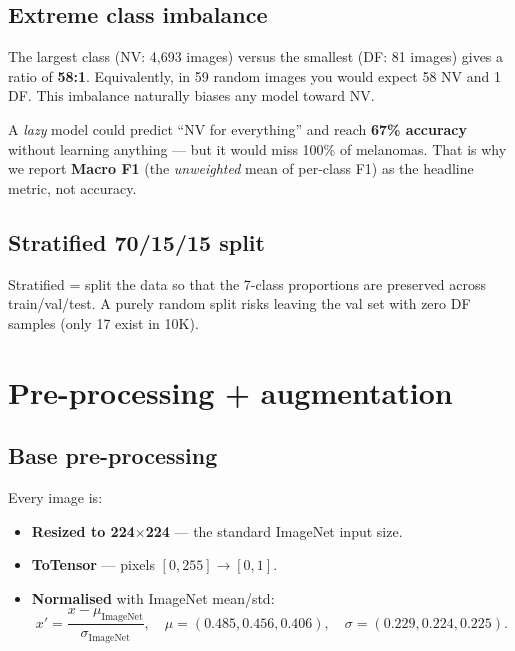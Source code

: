 \documentclass[11pt,a4paper]{article}
\begin{document}
\subsection{Extreme class imbalance}

\begin{simple}
The largest class (NV: 4{,}693 images) versus the smallest (DF: 81 images) gives a ratio of \textbf{58:1}. Equivalently, in 59 random images you would expect 58 NV and 1 DF. This imbalance naturally biases any model toward NV.
\end{simple}

\begin{idea}
A \textit{lazy} model could predict ``NV for everything'' and reach \textbf{67\% accuracy} without learning anything --- but it would miss 100\% of melanomas. That is why we report \textbf{Macro F1} (the \textit{unweighted} mean of per-class F1) as the headline metric, not accuracy.
\end{idea}

\subsection{Stratified 70/15/15 split}

\begin{simple}
Stratified = split the data so that the 7-class proportions are preserved across train/val/test. A purely random split risks leaving the val set with zero DF samples (only 17 exist in 10K).
\end{simple}

\section{Pre-processing + augmentation}

\subsection{Base pre-processing}

Every image is:
\begin{itemize}[leftmargin=*]
  \item \textbf{Resized to 224$\times$224} --- the standard ImageNet input size.
  \item \textbf{ToTensor} --- pixels $[0, 255] \to [0, 1]$.
  \item \textbf{Normalised} with ImageNet mean/std:
  \[
    x' = \frac{x - \mu_{\text{ImageNet}}}{\sigma_{\text{ImageNet}}}, \quad
    \mu = (0.485, 0.456, 0.406), \quad \sigma = (0.229, 0.224, 0.225).
  \]
\end{itemize}
\end{document}
